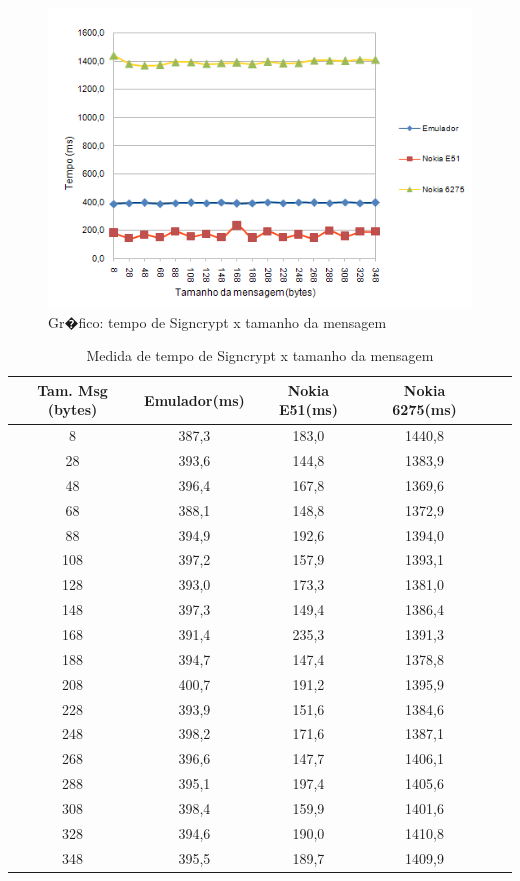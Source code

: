 \documentclass[a4paper,capchap,espacoduplo,normaltoc]{abntepusp}
\begin{document}
\begin{figure}
	\centering
		\includegraphics{figuras/teste_variando_tamanho_mensagem.PNG}
	\caption{Gr�fico: tempo de Signcrypt x tamanho da mensagem}
	\label{fig:teste_variando_tamanho_mensagem}
\end{figure}

\begin{table}[h]\centering
\caption{Medida de tempo de Signcrypt x tamanho da mensagem} \label{tab:signxmsgfinal}
\begin{tabular}{cccccc}\hline
Tam. Msg (bytes)	&Emulador(ms)	&Nokia E51(ms)	&Nokia 6275(ms)\\\hline
8	& 387,3	& 183,0	& 1440,8\\\hline
28	& 393,6	& 144,8	& 1383,9\\\hline
48	& 396,4	& 167,8	& 1369,6\\\hline
68	& 388,1	& 148,8	& 1372,9\\\hline
88	& 394,9	& 192,6	& 1394,0\\\hline
108	& 397,2	& 157,9	& 1393,1\\\hline
128	& 393,0	& 173,3	& 1381,0\\\hline
148	& 397,3	& 149,4	& 1386,4\\\hline
168	& 391,4	& 235,3	& 1391,3\\\hline
188	& 394,7	& 147,4	& 1378,8\\\hline
208	& 400,7	& 191,2	& 1395,9\\\hline
228	& 393,9	& 151,6	& 1384,6\\\hline
248	& 398,2	& 171,6	& 1387,1\\\hline
268	& 396,6	& 147,7	& 1406,1\\\hline
288	& 395,1	& 197,4	& 1405,6\\\hline
308	& 398,4	& 159,9	& 1401,6\\\hline
328	& 394,6	& 190,0	& 1410,8\\\hline
348	& 395,5	& 189,7	& 1409,9\\\hline
\end{tabular}
\end{table}
\end{document}
